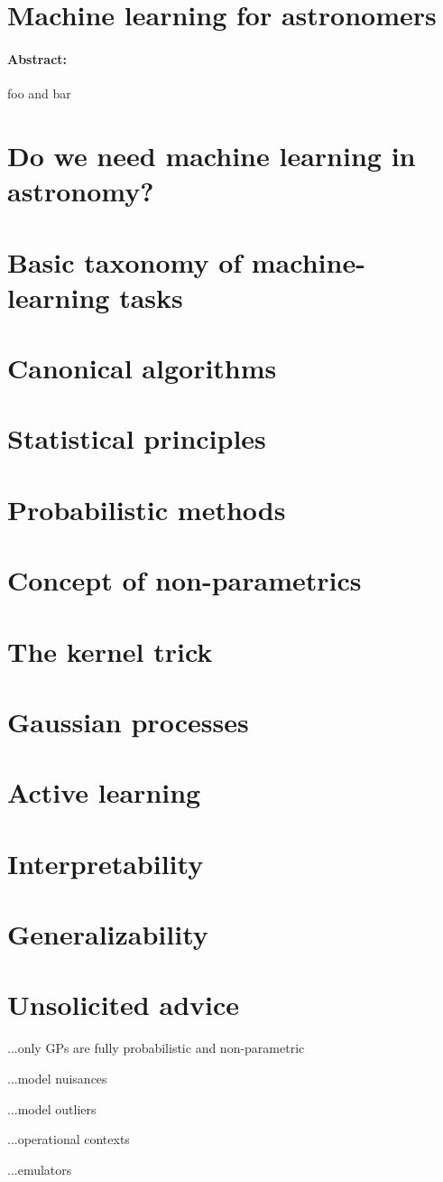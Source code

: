 \documentclass[12pt, letterpaper]{article}
\begin{document}
\section*{Machine learning for astronomers}

\paragraph{Abstract:} foo and bar

\section{Do we need machine learning in astronomy?}

\section{Basic taxonomy of machine-learning tasks}

\section{Canonical algorithms}

\section{Statistical principles}

\section{Probabilistic methods}

\section{Concept of non-parametrics}

\section{The kernel trick}

\section{Gaussian processes}

\section{Active learning}

\section{Interpretability}

\section{Generalizability}

\section{Unsolicited advice}

...only GPs are fully probabilistic and non-parametric

...model nuisances

...model outliers

...operational contexts

...emulators
\end{document}
